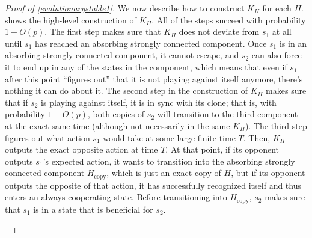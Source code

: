 \documentclass[12pt]{article}
\theoremstyle{definition}
\theoremstyle{remark}
\begin{document}
\begin{proof}[Proof of \cref{evolutionarystable1}]
      We now describe how to construct $K_H$ for each $H$.  shows the high-level construction of $K_H$.
       All of the steps succeed with probability $1 - O(p)$. The first step makes sure that $K_H$ does not deviate from $s_1$ at all
        until $s_1$ has reached an absorbing strongly connected component. 
       Once $s_1$ is in an absorbing strongly connected component, it cannot escape, and $s_2$ can also force it to end up in any of the states in the component, which means that even if $s_1$ after this point ``figures out'' that it is not playing against itself anymore, there's nothing it can do about it.
      The second step in the construction of $K_H$ makes sure that if $s_2$ is playing against itself, it is in sync with its clone; that is, with probability $1 - O(p)$, both copies of $s_2$ will transition to the third component at the exact same time (although not necessarily in the same $K_H$). 
      The third step figures out what action $s_1$ would take at some large finite time $T$. 
      Then, $K_H$ outputs the exact opposite action at time $T$. 
      At that point, if its opponent outputs $s_1$'s expected action, it wants to transition into the absorbing strongly connected component $H_\text{copy}$, which is just an exact copy of $H$, but if its opponent outputs the opposite of that action, it has successfully recognized itself and thus enters an always cooperating state.
      Before transitioning into $H_\text{copy}$, $s_2$ makes sure that $s_1$ is in a state that is beneficial for $s_2$.

      \begin{figure}
        \centering
\end{figure}
\end{proof}
\end{document}
